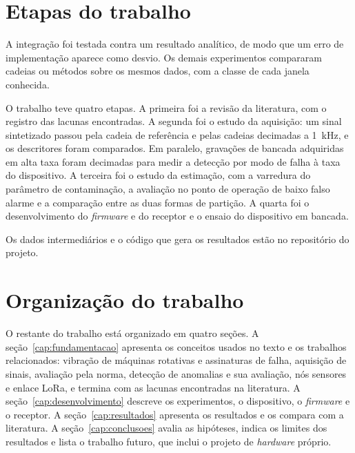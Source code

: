 \section{Etapas do trabalho}
\label{sec:intro-etapas}

A integração foi testada contra um resultado analítico, de modo que um erro de implementação
aparece como desvio. Os demais experimentos compararam cadeias ou métodos sobre os mesmos dados,
com a classe de cada janela conhecida.

O trabalho teve quatro etapas. A primeira foi a revisão da literatura, com o registro das
lacunas encontradas. A segunda foi o estudo da aquisição: um sinal sintetizado passou pela
cadeia de referência e pelas cadeias decimadas a \SI{1}{\kilo\hertz}, e os descritores foram
comparados. Em paralelo, gravações de bancada adquiridas em alta taxa foram decimadas para
medir a detecção por modo de falha à taxa do dispositivo. A terceira foi o estudo da
estimação, com a varredura do parâmetro de contaminação, a avaliação no ponto de operação
de baixo falso alarme e a comparação entre as duas formas de partição. A quarta foi o
desenvolvimento do \emph{firmware} e do receptor e o ensaio do dispositivo em bancada.

Os dados intermediários e o código que gera os resultados estão no repositório do projeto.

\section{Organização do trabalho}
\label{sec:intro-organizacao}

O restante do trabalho está organizado em quatro seções. A
seção~\ref{cap:fundamentacao} apresenta os conceitos usados no texto e os trabalhos
relacionados: vibração de máquinas rotativas e assinaturas de falha, aquisição de sinais,
avaliação pela norma, detecção de anomalias e sua avaliação, nós sensores e enlace LoRa, e
termina com as lacunas encontradas na literatura. A
seção~\ref{cap:desenvolvimento} descreve os experimentos, o dispositivo, o \emph{firmware}
e o receptor. A seção~\ref{cap:resultados} apresenta os resultados e os compara com a
literatura. A seção~\ref{cap:conclusoes} avalia as hipóteses, indica os limites dos
resultados e lista o trabalho futuro, que inclui o projeto de \emph{hardware} próprio.
